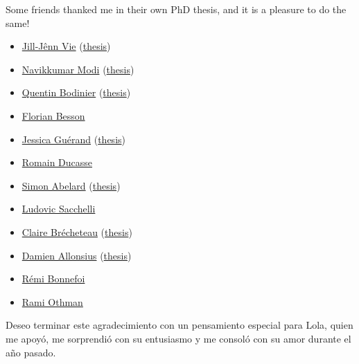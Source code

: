 \begin{acknowledgements}
Some friends thanked me in their own PhD thesis, and it is a pleasure to do the same!
%
\begin{itemize}
\item
  \href{http://jill-jenn.net/}{Jill-Jênn Vie}
  (\href{http://jiji.cat/cat.pdf}{thesis})
\item
  \href{https://navikkumarmodi.wordpress.com/}{Navikkumar Modi}
  (\href{https://tel.archives-ouvertes.fr/tel-01668536/document}{thesis})
\item
  \href{https://quentinbodinier.wordpress.com/}{Quentin Bodinier}
  (\href{https://www.theses.fr/2017REN1S091}{thesis})
\item
  \href{https://paris-sorbonne.academia.edu/FBesson}{Florian Besson}
\item
  \href{https://sites.google.com/view/guerand}{Jessica Guérand}
  (\href{https://drive.google.com/open?id=17CBibM8ZlzIbyVxpxktK3j5rNePALUs8}{thesis})
\item
  \href{https://sites.google.com/view/ducasse/}{Romain Ducasse}
\item
  \href{https://members.loria.fr/SAbelard/}{Simon Abelard}
  (\href{https://members.loria.fr/SAbelard/theseabelard.pdf}{thesis})
\item
  \href{http://www.cmap.polytechnique.fr/~sacchelli/}{Ludovic Sacchelli}
\item
  \href{http://pages.saclay.inria.fr/claire.brecheteau/}{Claire
  Brécheteau}
  (\href{https://hal.archives-ouvertes.fr/tel-01897787/document}{thesis})
\item
  \href{http://www.i2m.univ-amu.fr/perso/damien.allonsius/}{Damien
  Allonsius}
  (\href{http://www.i2m.univ-amu.fr/perso/damien.allonsius/documents/recherche/these/Main.pdf}{thesis})
\item
  \href{https://remibonnefoi.wordpress.com/}{Rémi Bonnefoi}
\item
  \href{https://remibonnefoi.wordpress.com/}{Rami Othman}
\end{itemize}

Deseo terminar este agradecimiento con un pensamiento especial para Lola, quien me apoyó, me sorprendió con su entusiasmo y me consoló con su amor durante el año pasado.

\end{acknowledgements}
